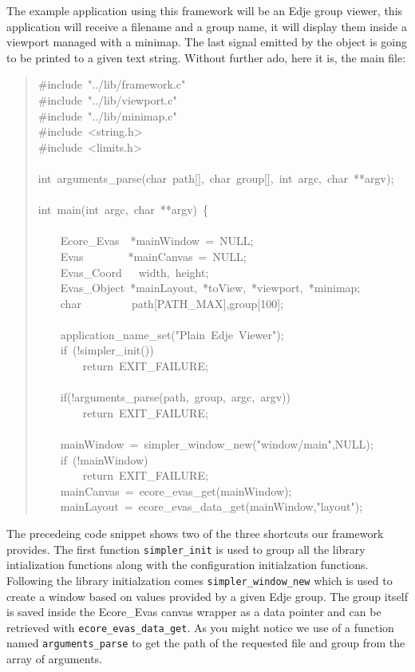 \documentclass[12pt,a4paper,english]{book}
\begin{document}
The example application using this framework will be an Edje group viewer, this
application will receive a filename and a group name, it will display them
inside a viewport managed with a minimap. The last signal emitted by the object
is going to be printed to a given text string. Without further ado, here it is,
the main file:
\begin{quote}{\ttfamily \raggedright \noindent
{\#}include~"../lib/framework.c"~\\
{\#}include~"../lib/viewport.c"~\\
{\#}include~"../lib/minimap.c"~\\
{\#}include~<string.h>~\\
{\#}include~<limits.h>~\\
~\\
int~arguments{\_}parse(char~path{[}{]},~char~group{[}{]},~int~argc,~char~**argv);~\\
~\\
int~main(int~argc,~char~**argv)~{\{}~\\
~\\
~~~~Ecore{\_}Evas~~*mainWindow~=~NULL;~\\
~~~~Evas~~~~~~~~*mainCanvas~=~NULL;~\\
~~~~Evas{\_}Coord~~~width,~height;~\\
~~~~Evas{\_}Object~*mainLayout,~*toView,~*viewport,~*minimap;~\\
~~~~char~~~~~~~~~path{[}PATH{\_}MAX{]},group{[}100{]};~\\
~\\
~~~~application{\_}name{\_}set("Plain~Edje~Viewer");~\\
~~~~if~(!simpler{\_}init())~\\
~~~~~~~~return~EXIT{\_}FAILURE;~\\
~\\
~~~~if(!arguments{\_}parse(path,~group,~argc,~argv))~\\
~~~~~~~~return~EXIT{\_}FAILURE;~\\
~\\
~~~~mainWindow~=~simpler{\_}window{\_}new("window/main",NULL);~\\
~~~~if~(!mainWindow)~\\
~~~~~~~~return~EXIT{\_}FAILURE;~\\
~~~~mainCanvas~=~ecore{\_}evas{\_}get(mainWindow);~\\
~~~~mainLayout~=~ecore{\_}evas{\_}data{\_}get(mainWindow,"layout");
}\end{quote}

The precedeing code snippet shows two of the three shortcuts our framework
provides. The first function \texttt{simpler{\_}init} is used to group all the library
intialization functions along with the configuration initialzation functions.
Following the library initialzation comes \texttt{simpler{\_}window{\_}new} which is used
to create a window based on values provided by a given Edje group. The group
itself is saved inside the Ecore{\_}Evas canvas wrapper as a data pointer and can
be retrieved with \texttt{ecore{\_}evas{\_}data{\_}get}. As you might notice we use of a
function named \texttt{arguments{\_}parse} to get the path of the requested file and
group from the array of arguments.
\end{document}

